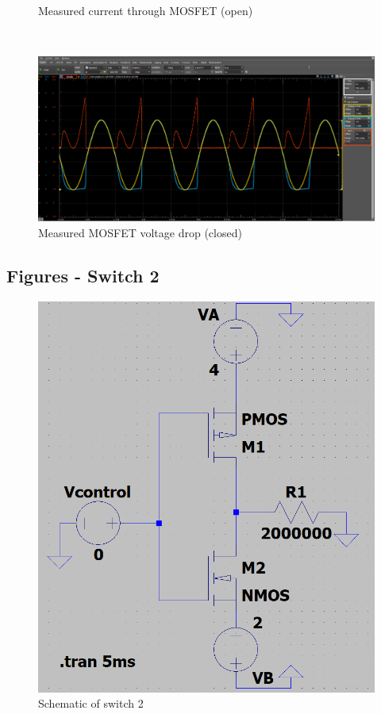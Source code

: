 \documentclass[12pt]{article}
\begin{document}
\begin{landscape}
\begin{figure}[ht!]
\begin{minipage}[b]{0.33\linewidth}
            \caption{Measured current through MOSFET (open)} 
            \vspace{4ex}
        \end{minipage}%
        ~
        \begin{minipage}[b]{0.33\linewidth}
            \centering
            \includegraphics[width=\linewidth]{images/S1Closed.png} 
            \caption{Measured MOSFET voltage drop (closed)} 
            \vspace{4ex}
        \end{minipage}%
    \end{figure}
\end{landscape}
\pagebreak
\begin{landscape}
    \pagestyle{lscapedplain}
    \appendix
    \section{Figures - Switch 2}
    \begin{figure}[ht!]
        \begin{minipage}[b]{0.33\linewidth}
            \centering
            \includegraphics[width=0.7\linewidth]{images/S2Schematic.png} 
            \caption{Schematic of switch 2} 
            \vspace{4ex}
        \end{minipage}%
    \end{figure}
\end{landscape}
\end{document}
